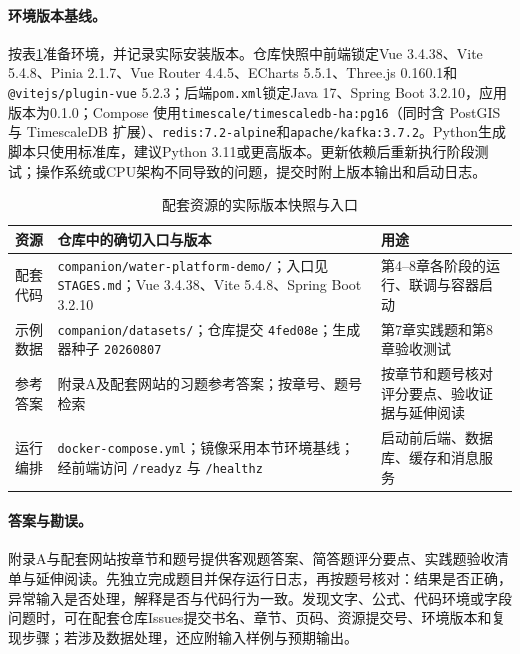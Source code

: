 \paragraph{环境版本基线。}按表\ref{tab:preface-companion-versions}准备环境，并记录实际安装版本。仓库快照中前端锁定Vue 3.4.38、Vite 5.4.8、Pinia 2.1.7、Vue Router 4.4.5、ECharts 5.5.1、Three.js 0.160.1和\texttt{@vitejs/plugin-vue} 5.2.3；后端\texttt{pom.xml}锁定Java 17、Spring Boot 3.2.10，应用版本为0.1.0；Compose 使用\texttt{timescale/timescaledb-ha:pg16}（同时含 PostGIS 与 TimescaleDB 扩展）、\texttt{redis:7.2-alpine}和\texttt{apache/kafka:3.7.2}。Python生成脚本只使用标准库，建议Python 3.11或更高版本。更新依赖后重新执行阶段测试；操作系统或CPU架构不同导致的问题，提交时附上版本输出和启动日志。

\begin{table}[htbp]
\centering
\caption{配套资源的实际版本快照与入口}
\label{tab:preface-companion-versions}
\begin{tabular}{p{3.1cm}p{5.1cm}p{3.7cm}}
\toprule
资源 & 仓库中的确切入口与版本 & 用途 \\
\midrule
配套代码 & \texttt{companion/}\allowbreak\texttt{water-platform-}\allowbreak\texttt{demo/}；入口见\texttt{STAGES.md}；Vue 3.4.38、Vite 5.4.8、Spring Boot 3.2.10 & 第4--8章各阶段的运行、联调与容器启动 \\
示例数据 & \texttt{companion/datasets/}；仓库提交 \texttt{4fed08e}；生成器种子 \texttt{20260807} & 第7章实践题和第8章验收测试 \\
参考答案 & 附录A及配套网站的习题参考答案；按章号、题号检索 & 按章节和题号核对评分要点、验收证据与延伸阅读 \\
运行编排 & \texttt{docker-compose.yml}；镜像采用本节环境基线；经前端访问 \texttt{/readyz} 与 \texttt{/healthz} & 启动前后端、数据库、缓存和消息服务 \\
\bottomrule
\end{tabular}
\end{table}

\paragraph{答案与勘误。}附录A与配套网站按章节和题号提供客观题答案、简答题评分要点、实践题验收清单与延伸阅读。先独立完成题目并保存运行日志，再按题号核对：结果是否正确，异常输入是否处理，解释是否与代码行为一致。发现文字、公式、代码环境或字段问题时，可在配套仓库Issues提交书名、章节、页码、资源提交号、环境版本和复现步骤；若涉及数据处理，还应附输入样例与预期输出。

